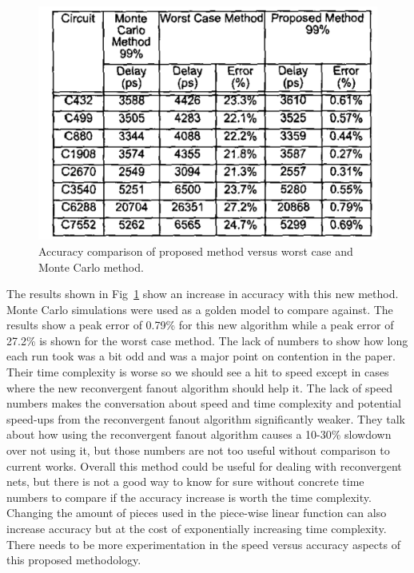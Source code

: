\documentclass[journal,12pt]{IEEEtran}
\begin{document}
\begin{figure}
  \centering
  \includegraphics[width=0.95\columnwidth]{results.png}
  \caption{Accuracy comparison of proposed method versus worst case
    and Monte Carlo method.}\label{fig:results}
\end{figure}
The results shown in Fig~\ref{fig:results} show an increase in
accuracy with this new method. Monte Carlo simulations were used as a
golden model to compare against. The results show a peak error of
0.79\% for this new algorithm while a peak error of 27.2\% is shown
for the worst case method. The
lack of numbers to show how long each run took was a bit odd and was a
major point on contention in the paper. Their time complexity is worse
so we should see a hit to speed except in cases where the new
reconvergent fanout algorithm should help it. The lack of speed
numbers makes the conversation about speed and time complexity and
potential speed-ups from the reconvergent fanout algorithm
significantly weaker. They talk about how using the reconvergent
fanout algorithm causes a 10-30\% slowdown over not using it, but
those numbers are not too useful without comparison to current
works. Overall this method could be useful for dealing with
reconvergent nets, but there is not a good way to know for sure
without concrete time numbers to compare if the accuracy increase is
worth the time complexity. Changing the amount of pieces used in the
piece-wise linear function can also increase accuracy but at the cost
of exponentially increasing time complexity. There needs to be more
experimentation in the speed versus accuracy aspects of this proposed
methodology.
\end{document}
